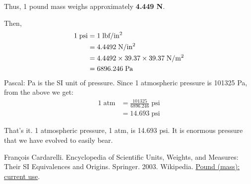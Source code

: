 \documentclass[a6paper]{article}
\begin{document}
Thus, 1 pound mass weighs approximately \textbf{4.449 \si{\newton}}.

Then, 
\begin{align*}
    1 \; \text{psi} 
    &= 1 \; \text{lbf/in\textsuperscript{2}} \\
    &= 4.4492 \; \text{N/in\textsuperscript{2}} \\
    &= 4.4492 \times 39.37 \times 39.37\; \text{N/m\textsuperscript{2}} \\
    &= 6896.246 \; \si{\pascal}
\end{align*}
Pascal: \si{\pascal} is the SI unit of pressure. Since 1 atmospheric pressure is 101325 \si{\pascal}, from the above we get:
\begin{align*}
    1 \; \text{atm} 
    &= \frac{101325}{6896.246} \;\text{psi} \\
    &= 14.693 \; \text{psi}
\end{align*}

That's it. 1 atmospheric pressure, 1 atm, is 14.693 psi. It is enormous pressure that we have evolved to easily bear.

\begin{thebibliography}{00}
     Fran{\c c}ois Cardarelli. Encyclopedia of Scientific Units, Weights, and Measures: Their SI Equivalences and Origins. Springer. 2003.
     Wikipedia. \href{https://en.wikipedia.org/wiki/Pound\_(mass)\#Current\_use}{Pound (mass): current use}.
\end{thebibliography}
\end{document}
